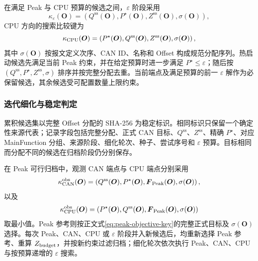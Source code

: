 \documentclass[UTF8,a4paper,twoside,zihao=-4]{ctexart}
\numberwithin{equation}{section}
\numberwithin{figure}{section}
\numberwithin{table}{section}
\theoremstyle{definition}
\numberwithin{algocf}{section}
\begin{document}
在满足 Peak 与 CPU 预算的候选之间，$\varepsilon$ 阶段采用
\begin{equation}
 \kappa_{\varepsilon}(\boldsymbol O)
 =
 \left(
  Q^{\mathrm{ss}}(\boldsymbol O),
  P^\star(\boldsymbol O),
  Z^{\mathrm{ss}}(\boldsymbol O),
  \sigma(\boldsymbol O)
 \right),
\label{eq:joint-epsilon-comparator}
\end{equation}
CPU 方向的搜索比较键为
\begin{equation}
 \kappa_{\rm CPU}(\boldsymbol O)
 =
 \left(
  P^\star(\boldsymbol O),
  Q^{\mathrm{ss}}(\boldsymbol O),
  Z^{\mathrm{ss}}(\boldsymbol O),
  \sigma(\boldsymbol O)
 \right),
\label{eq:joint-cpu-comparator}
\end{equation}
其中 $\sigma(\boldsymbol O)$ 按报文定义次序、CAN ID、名称和 Offset 构成规范分配序列。热启动候选先满足当前 Peak 约束，并在给定预算时进一步满足 $P^\star\le\varepsilon$；随后按 $(Q^{\mathrm{ss}},P^\star,Z^{\mathrm{ss}},\sigma)$ 排序并按完整分配去重。当前端点及满足预算的前一 $\varepsilon$ 解作为必保留候选，其余候选受可配置数量上限约束。

\subsubsection{迭代细化与稳定判定}
\label{subsubsec:appendix-joint-refinement-details}

累积候选集以完整 Offset 分配的 SHA-256 为稳定标识。相同标识只保留一个确定性来源代表；记录字段包括完整分配、正式 CAN 目标、$Q^{\mathrm{ss}}$、$Z^{\mathrm{ss}}$、精确 $P^\star$、对应 MainFunction 分组、来源阶段、细化轮次、种子、尝试序号和 $\varepsilon$ 预算。目标相同而分配不同的候选在归档阶段仍分别保存。

在 Peak 可行归档中，观测 CAN 端点与 CPU 端点分别采用
\begin{equation}
 \kappa_{\rm CAN}^{\rm obs}(\boldsymbol O)
 =
 \left(
  Q^{\mathrm{ss}}(\boldsymbol O),
  P^\star(\boldsymbol O),
  \boldsymbol F_{\rm Peak}(\boldsymbol O),
  \sigma(\boldsymbol O)
 \right),
\label{eq:observed-can-endpoint-key}
\end{equation}
以及
\begin{equation}
 \kappa_{\rm CPU}^{\rm obs}(\boldsymbol O)
 =
 \left(
  P^\star(\boldsymbol O),
  Q^{\mathrm{ss}}(\boldsymbol O),
  \boldsymbol F_{\rm Peak}(\boldsymbol O),
  \sigma(\boldsymbol O)
 \right)
\label{eq:observed-cpu-endpoint-key}
\end{equation}
取最小值。Peak 参考则按正文式\eqref{eq:peak-objective-key}的完整正式目标及 $\sigma(\boldsymbol O)$ 选择。每次 Peak、CAN、CPU 或 $\varepsilon$ 阶段并入新候选后，均重新选择 Peak 参考、重算 $Z_{\rm budget}$，并按新约束过滤归档；细化轮次依次执行 Peak、CAN、CPU 与按预算递增的 $\varepsilon$ 搜索。
\end{document}
